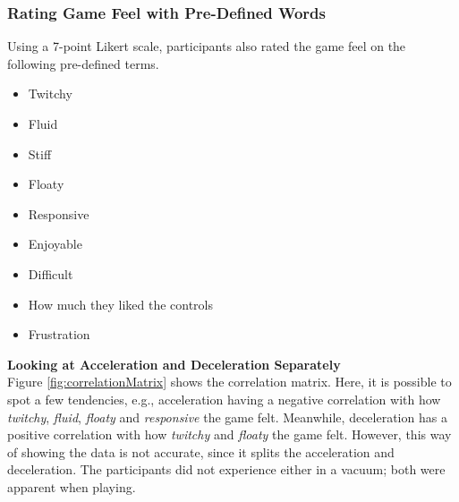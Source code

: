 \subsubsection{Rating Game Feel with Pre-Defined Words}
Using a 7-point Likert scale, participants also rated the game feel on the following pre-defined terms.
\begin{itemize}[noitemsep,nolistsep]
\item Twitchy
\item Fluid
\item Stiff
\item Floaty
\item Responsive
\item Enjoyable
\item Difficult
\item How much they liked the controls
\item Frustration
\end{itemize}

\textbf{Looking at Acceleration and Deceleration Separately}\\
Figure \ref{fig:correlationMatrix} shows the correlation matrix. Here, it is possible to spot a few tendencies, e.g., acceleration having a negative correlation with how \textit{twitchy}, \textit{fluid}, \textit{floaty} and \textit{responsive} the game felt. Meanwhile, deceleration has a positive correlation with how \textit{twitchy} and \textit{floaty} the game felt. However, this way of showing the data is not accurate, since it splits the acceleration and deceleration. The participants did not experience either in a vacuum; both were apparent when playing.



